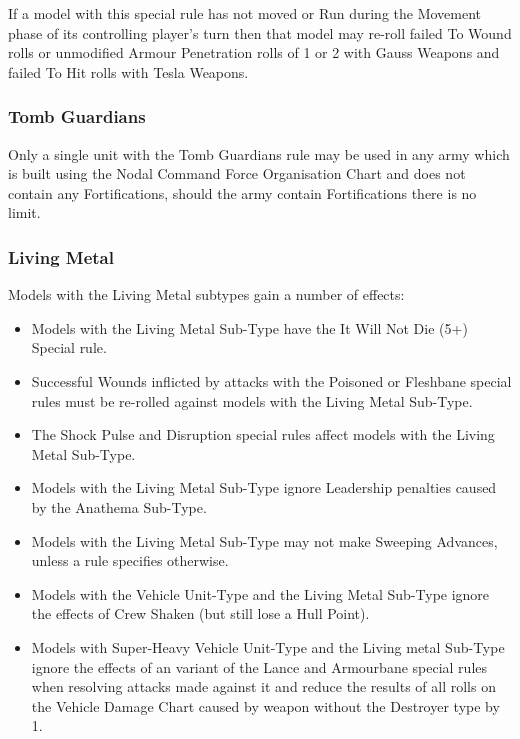 \begin{multicols}{2}
If a model with this special rule has not moved or Run during the Movement phase of its controlling player’s turn then that model may re-roll failed To Wound rolls or unmodified Armour Penetration rolls of 1 or 2 with Gauss Weapons and failed To Hit rolls with Tesla Weapons.

\subsubsection{Tomb Guardians} \label{Tomb Guardians}

Only a single unit with the Tomb Guardians rule may be used in any army which is built using the Nodal Command Force Organisation Chart and does not contain any Fortifications, should the army contain Fortifications there is no limit.

\end{multicols}


\subsubsection{Living Metal} \label{Living Metal}

Models with the Living Metal subtypes gain a number of effects:

\begin{itemize}
	\item Models with the Living Metal Sub-Type have the It Will Not Die (5+) Special rule.
	\item Successful Wounds inflicted by attacks with the Poisoned or Fleshbane special rules must be re-rolled against models with the Living Metal Sub-Type.
	\item The Shock Pulse and Disruption special rules affect models with the Living Metal Sub-Type.
	\item Models with the Living Metal Sub-Type ignore Leadership penalties caused by the Anathema Sub-Type.
	\item Models with the Living Metal Sub-Type may not make Sweeping Advances, unless a rule specifies otherwise.
\end{itemize} 

\begin{itemize}
	\item Models with the Vehicle Unit-Type and the Living Metal Sub-Type ignore the effects of Crew Shaken (but still lose a Hull Point).
	\item Models with Super-Heavy Vehicle Unit-Type and the Living metal Sub-Type ignore the effects of an variant of the Lance and Armourbane special rules when resolving attacks made against it and reduce the results of all rolls on the Vehicle Damage Chart caused by weapon without the Destroyer type by 1.
\end{itemize} 

